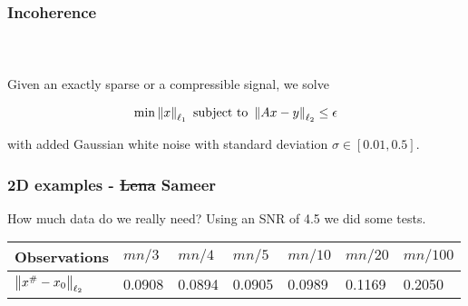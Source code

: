 
\begin{frame}[t]
\frametitle{Incoherence}
\framesubtitle{~~}  %

Given an exactly sparse or a compressible signal, we solve

\begin{align*}
	\min \left\lVert x \right\rVert_{\ell_1} \text{ subject to } \left\lVert Ax - y \right\rVert_{\ell_2} \leq \epsilon
\end{align*}

with added Gaussian white noise with standard deviation $\sigma\in [0.01,0.5]$.


\end{frame}


\begin{frame}[t]
	\frametitle{2D examples - \st{Lena} Sameer}

How much data do we really need? Using an SNR of 4.5 we did some tests.
\pause

\begin{table}[h]
\begin{tabular}{l|l|l|l|l|l|l}
Observations                 & $mn/3$ & $mn/4$ & $mn/5$ & $mn/10$ & $mn/20$ & $mn/100$ \\ \hline
$\left\lVert x^\# - x_0 \right\rVert_{\ell_2}$ & 0.0908 & 0.0894 & 0.0905 & 0.0989  & 0.1169  & 0.2050   \\
\end{tabular}
\end{table}

\end{frame}




